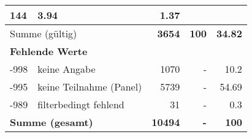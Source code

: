 \begin{longtable}{lXrrr}
       \num{144} &
       \num[round-mode=places,round-precision=2]{3.94} &
         \num[round-mode=places,round-precision=2]{1.37} \\
     \midrule
     \multicolumn{2}{l}{Summe (gültig)} &
       \textbf{\num{3654}} &
     \textbf{\num{100}} &
       \textbf{\num[round-mode=places,round-precision=2]{34.82}} \\
     \multicolumn{5}{l}{\textbf{Fehlende Werte}}\\
       -998 &
       keine Angabe &
         \num{1070} &
        - &
         \num[round-mode=places,round-precision=2]{10.2} \\
       -995 &
       keine Teilnahme (Panel) &
         \num{5739} &
        - &
         \num[round-mode=places,round-precision=2]{54.69} \\
       -989 &
       filterbedingt fehlend &
         \num{31} &
        - &
         \num[round-mode=places,round-precision=2]{0.3} \\
     \midrule
     \multicolumn{2}{l}{\textbf{Summe (gesamt)}} &
          \textbf{\num{10494}} &
        \textbf{-} &
        \textbf{\num{100}} \\
     \bottomrule
     \end{longtable}
     
